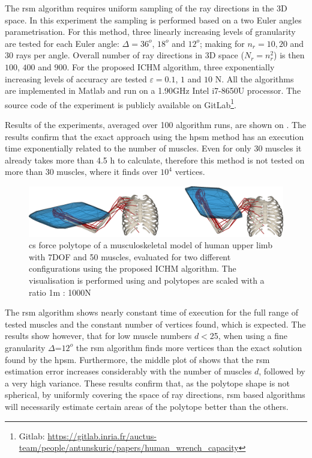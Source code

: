 The \gls{rsm} algorithm \cite{carmichael2011Towards} requires uniform sampling of the ray directions in the 3D space. In this experiment the sampling is performed based on a two Euler angles parametrisation. {For this method, three linearly increasing levels of granularity are tested for each Euler angle: $\Delta\!=\!36^o$, $18^o$ and $12^o$;  making for $n_r\!=\!10,20$ and $30$ rays per angle. Overall number of ray directions in 3D space ($N_r\!=\!n_r^2$) is then $100$, $400$ and $900$. For the proposed ICHM algorithm, three exponentially increasing levels of accuracy are tested $\varepsilon\!=\!0.1$, $1$ and $10$ N.} All the algorithms are implemented in Matlab and run on a 1.90GHz Intel i7-8650U processor. The source code of the experiment is publicly available on GitLab\footnote{Gitlab: \url{https://gitlab.inria.fr/auctus-team/people/antunskuric/papers/human_wrench_capacity}}.

Results of the experiments, averaged over 100 algorithm runs, are shown on . The results confirm that the exact approach using the \gls{hpsm} method has an execution time exponentially related to the number of muscles. Even for only 30 muscles it already takes more than 4.5 h to calculate, therefore this method is not tested on more than 30 muscles, where it finds over $10^4$ vertices.  

\begin{figure}[!t]
    \centering
    \includegraphics[width=\linewidth]{Papers/images/force.png}
    \caption{\gls{cs} force polytope of a musculoskeletal model of human upper limb  \cite{saul2015benchmarking} with 7DOF and 50 muscles, evaluated for two different configurations using the proposed ICHM algorithm. The visualisation is performed using  \cite{Michaud2021} and polytopes are scaled with a ratio 1m : 1000N}
    \label{fig:images_bimanual}
\end{figure}
The \gls{rsm} algorithm shows nearly constant time of execution for the full range of tested muscles and the constant number of vertices found, which is expected. The results show however, that for low muscle numbers $d\!<$25, when using a fine granularity $\Delta$=$12^o$ the \gls{rsm} algorithm finds more vertices than the exact solution found by the \gls{hpsm}. Furthermore, the middle plot of  shows that the \gls{rsm} estimation error increases considerably with the number of muscles $d$, followed by a very
high variance. These results confirm that, as the polytope shape is not spherical, by uniformly covering the space of ray directions, \gls{rsm} based algorithms will necessarily estimate certain areas of the polytope better than the others.

